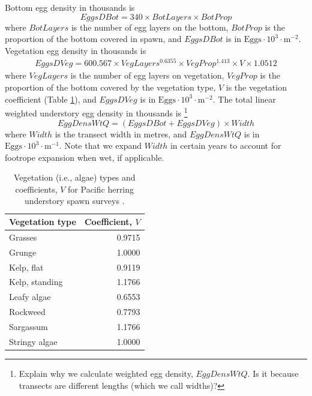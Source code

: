 \documentclass[12pt]{article}
\begin{document}
Bottom egg density in thousands is \citep{HaegeleEtal1979}
\begin{equation}
EggsDBot = 340 \times BotLayers \times BotProp
\label{eqEggDensUnderB}
\end{equation}
where $BotLayers$ is the number of egg layers on the bottom, $BotProp$ is the proportion of the bottom covered in spawn, and $EggsDBot$ is in $\text{Eggs} \cdot 10^{3} \cdot \text{m}^{-2}$.
Vegetation egg density in thousands is \citep{Schweigert2005}
\begin{multline}
EggsDVeg = 600.567 \times VegLayers^{0.6355} \times VegProp^{1.413} \times V \times 1.0512
\label{eqEggDensUnderV}
\end{multline}
where $VegLayers$ is the number of egg layers on vegetation, $VegProp$ is the proportion of the bottom covered by the vegetation type, $V$ is the vegetation coefficient (Table \ref{tabVegTypes}), and $EggsDVeg$ is in $\text{Eggs} \cdot 10^{3} \cdot \text{m}^{-2}$.
The total linear weighted understory egg density in thousands is%
\footnote{Explain why we calculate weighted egg density, $EggDensWtQ$.
Is it because transects are different lengths (which we call widths)?}
\begin{equation}
EggDensWtQ = \left( EggsDBot + EggsDVeg \right) \times Width
\label{eqEggDensWtUnder}
\end{equation}
where $Width$ is the transect width in metres, and $EggDensWtQ$ is in $\text{Eggs} \cdot 10^{3} \cdot \text{m}^{-1}$.
Note that we expand $Width$ in certain years to account for footrope expansion when wet, if applicable.

\begin{table}
\centering
\caption[Vegetation (i.e., algae) types and coefficients for Pacific herring understory spawn surveys]
{Vegetation (i.e., algae) types and coefficients, $V$ for Pacific herring understory spawn surveys \citep{Schweigert2005}.}
\begin{tabular}{lr}
\toprule
Vegetation type & Coefficient, $V$\\
\midrule
Grasses & 0.9715 \\
Grunge & 1.0000 \\
Kelp, flat & 0.9119 \\
Kelp, standing & 1.1766 \\
Leafy algae & 0.6553 \\
Rockweed & 0.7793 \\
Sargassum & 1.1766 \\
Stringy algae & 1.0000 \\
\bottomrule
\end{tabular}
\label{tabVegTypes}
\end{table}
\end{document}
